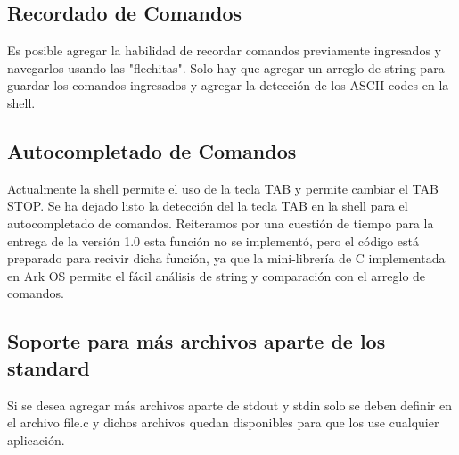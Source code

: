 \documentclass[a4paper,12pt]{article}
\begin{document}
	\subsection{Recordado de Comandos}
	Es posible agregar la habilidad de recordar comandos previamente ingresados y navegarlos usando las "flechitas". Solo hay que agregar un arreglo de string para guardar los comandos ingresados y agregar la detección de los ASCII codes en la shell.
	\subsection{Autocompletado de Comandos}
	Actualmente la shell permite el uso de la tecla TAB y permite cambiar el TAB STOP. Se ha dejado listo la detección del la tecla TAB en la shell para el autocompletado de comandos. Reiteramos por una cuestión de tiempo para la entrega de la versión 1.0 esta función no se implementó, pero el código está preparado para recivir dicha función, ya que la mini-librería de C implementada en Ark OS permite el fácil análisis de string y comparación con el arreglo de comandos.
	\subsection{Soporte para más archivos aparte de los standard}
	Si se desea agregar más archivos aparte de stdout y stdin solo se deben definir en el archivo file.c y dichos archivos quedan disponibles para que los use cualquier aplicación.
	
 
\end{document}
